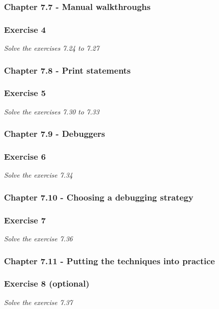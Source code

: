 \subsubsection{Chapter 7.7 - Manual walkthroughs}

\subsubsection*{Exercise 4}
\textit{Solve the exercises 7.24 to 7.27}

\subsubsection{Chapter 7.8 - Print statements}

\subsubsection*{Exercise 5}
\textit{Solve the exercises 7.30 to 7.33} \\


\subsubsection{Chapter 7.9 - Debuggers}

\subsubsection*{Exercise 6}
\textit{Solve the exercise 7.34} \\

\subsubsection{Chapter 7.10 - Choosing a debugging strategy}

\subsubsection*{Exercise 7}
\textit{Solve the exercise 7.36}

\subsubsection{Chapter 7.11 - Putting the techniques into practice}

\subsubsection*{Exercise 8 (optional)}
\textit{Solve the exercise 7.37}

